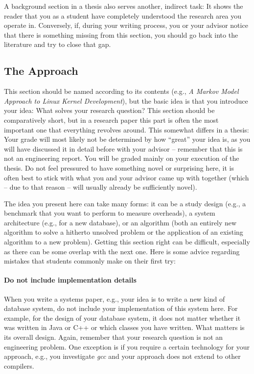 \documentclass[a4paper]{article}
\begin{document}
A background section in a thesis also serves another, indirect task:
It shows the reader that you as a student have completely understood the research area you operate in.
Conversely, if, during your writing process, you or your advisor notice that there is something missing from this section, you should go back into the literature and try to close that gap.

\subsection{The Approach}

This section should be named according to its contents (e.g., \emph{A Markov Model Approach to Linux Kernel Development}), but the basic idea is that you introduce your idea: What solves your research question?
This section should be comparatively short, but in a research paper this part is often the most important one that everything revolves around.
This somewhat differs in a thesis: Your grade will most likely not be determined by how ``great'' your idea is, as you will have discussed it in detail before with your advisor -- remember that this is not an engineering report.
You will be graded mainly on your execution of the thesis.
Do not feel pressured to have something novel or surprising here, it is often best to stick with what you and your advisor came up with together (which -- due to that reason -- will usually already be sufficiently novel).

The idea you present here can take many forms: it can be a study design (e.g., a benchmark that you want to perform to measure overheads), a system architecture (e.g., for a new database), or an algorithm (both an entirely new algorithm to solve a hitherto unsolved problem or the application of an existing algorithm to a new problem).
Getting this section right can be difficult, especially as there can be some overlap with the next one.
Here is some advice regarding mistakes that students commonly make on their first try:

\paragraph{Do not include implementation details}
When you write a systems paper, e.g., your idea is to write a new kind of database system, do not include your implementation of this system here.
For example, for the design of your database system, it does not matter whether it was written in Java or C++ or which classes you have written.
What matters is its overall design.
Again, remember that your research question is not an engineering problem.
One exception is if you require a certain technology for your approach, e.g., you investigate \emph{gcc} and your approach does not extend to other compilers.
\end{document}
